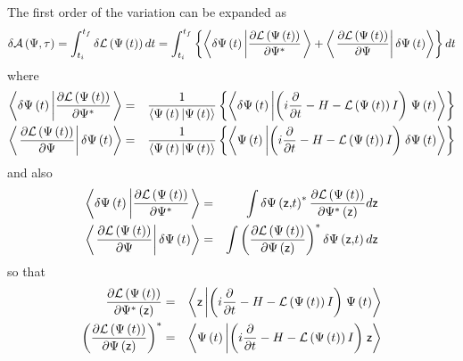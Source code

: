 \documentclass[aps,preprint]{revtex4}
\begin{document}
The first order of the variation can be expanded as 
\begin{equation*}
\delta \mathcal{A}\left( \Psi ,\tau \right) =\int_{t_{i}}^{t_{f}}\delta 
\mathcal{L}\left( \Psi \left( t\right) \right)
dt=\int_{t_{i}}^{t_{f}}\left\{ \left\langle \delta \Psi \left( t\right)
\left| \frac{\partial \mathcal{L}\left( \Psi \left( t\right) \right) }{%
\partial \Psi ^{\ast }}\right. \right\rangle +\left\langle \left. \frac{%
\partial \mathcal{L}\left( \Psi \left( t\right) \right) }{\partial \Psi }%
\right| \delta \Psi \left( t\right) \right\rangle \right\} dt
\end{equation*}%
where 
\begin{eqnarray}
\left\langle \delta \Psi \left( t\right) \left| \frac{\partial \mathcal{L}%
\left( \Psi \left( t\right) \right) }{\partial \Psi ^{\ast }}\right.
\right\rangle &=&\frac{1}{\left\langle \Psi \left( t\right) |\Psi \left(
t\right) \right\rangle }\left\{ \left\langle \delta \Psi \left( t\right)
\left| \left( i\frac{\partial }{\partial t}-H-\mathcal{L}\left( \Psi \left(
t\right) \right) I\right) \right. \Psi \left( t\right) \right\rangle \right\}
\notag \\
\left\langle \left. \frac{\partial \mathcal{L}\left( \Psi \left( t\right)
\right) }{\partial \Psi }\right| \delta \Psi \left( t\right) \right\rangle
&=&\frac{1}{\left\langle \Psi \left( t\right) |\Psi \left( t\right)
\right\rangle }\left\{ \left\langle \Psi \left( t\right) \left| \left( i%
\frac{\partial }{\partial t}-H-\mathcal{L}\left( \Psi \left( t\right)
\right) I\right) \right. \delta \Psi \left( t\right) \right\rangle \right\}
\end{eqnarray}%
and also 
\begin{eqnarray}
\left\langle \delta \Psi \left( t\right) \left| \frac{\partial \mathcal{L}%
\left( \Psi \left( t\right) \right) }{\partial \Psi ^{\ast }}\right.
\right\rangle &=&\int \delta \Psi \left( \mathsf{z,}t\right) ^{\ast }\frac{%
\partial \mathcal{L}\left( \Psi \left( t\right) \right) }{\partial \Psi
^{\ast }\left( \mathsf{z}\right) }d\mathsf{z} \\
\left\langle \left. \frac{\partial \mathcal{L}\left( \Psi \left( t\right)
\right) }{\partial \Psi }\right| \delta \Psi \left( t\right) \right\rangle
&=&\int \left( \frac{\partial \mathcal{L}\left( \Psi \left( t\right) \right) 
}{\partial \Psi \left( \mathsf{z}\right) }\right) ^{\ast }\delta \Psi \left( 
\mathsf{z,}t\right) d\mathsf{z}
\end{eqnarray}%
so that 
\begin{eqnarray}
\frac{\partial \mathcal{L}\left( \Psi \left( t\right) \right) }{\partial
\Psi ^{\ast }\left( \mathsf{z}\right) } &=&\left\langle \mathsf{z}\left|
\left( i\frac{\partial }{\partial t}-H-\mathcal{L}\left( \Psi \left(
t\right) \right) I\right) \right. \Psi \left( t\right) \right\rangle \\
\left( \frac{\partial \mathcal{L}\left( \Psi \left( t\right) \right) }{%
\partial \Psi \left( \mathsf{z}\right) }\right) ^{\ast } &=&\left\langle
\Psi \left( t\right) \left| \left( i\frac{\partial }{\partial t}-H-\mathcal{L%
}\left( \Psi \left( t\right) \right) I\right) \right. \mathsf{z}\right\rangle
\end{eqnarray}
\end{document}
